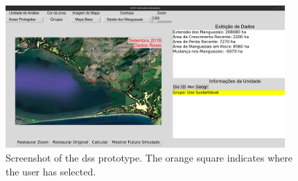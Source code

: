\begin{figure}[!htb] 
\centering
\includegraphics[width=0.95\textwidth]{Figures/chap4/rio-dss-screenshot.png}
\caption[Screenshot of Rio de Janeiro DSS]{Screenshot of the \ac{dss} prototype. The orange square indicates where the user has selected.}
\label{fig:rio-dss-screenshot}
\end{figure}

